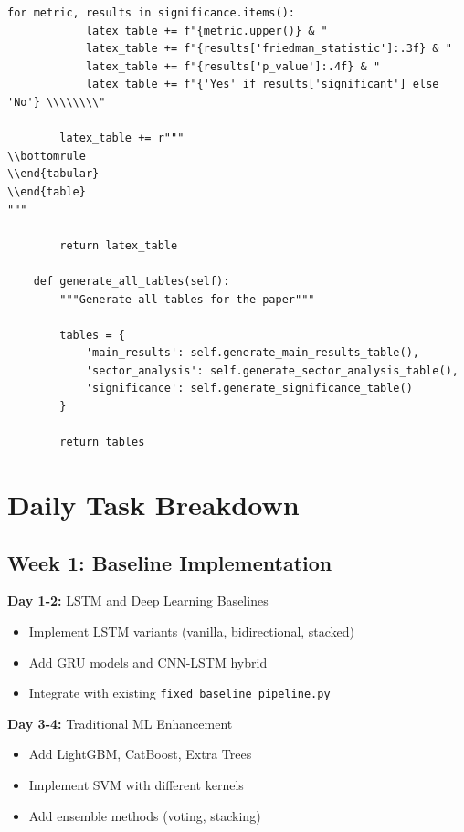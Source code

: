 \documentclass[11pt]{article}
\begin{document}
\begin{lstlisting}[style=pythonstyle, caption=Automated Paper Generation]
        for metric, results in significance.items():
            latex_table += f"{metric.upper()} & "
            latex_table += f"{results['friedman_statistic']:.3f} & "
            latex_table += f"{results['p_value']:.4f} & "
            latex_table += f"{'Yes' if results['significant'] else 'No'} \\\\\\\\"
            
        latex_table += r"""
\\bottomrule
\\end{tabular}
\\end{table}
"""
        
        return latex_table
        
    def generate_all_tables(self):
        """Generate all tables for the paper"""
        
        tables = {
            'main_results': self.generate_main_results_table(),
            'sector_analysis': self.generate_sector_analysis_table(),
            'significance': self.generate_significance_table()
        }
        
        return tables
\end{lstlisting}

\section{Daily Task Breakdown}

\subsection{Week 1: Baseline Implementation}

\textbf{Day 1-2:} LSTM and Deep Learning Baselines
\begin{itemize}
    \item Implement LSTM variants (vanilla, bidirectional, stacked)
    \item Add GRU models and CNN-LSTM hybrid
    \item Integrate with existing \texttt{fixed\_baseline\_pipeline.py}
\end{itemize}

\textbf{Day 3-4:} Traditional ML Enhancement
\begin{itemize}
    \item Add LightGBM, CatBoost, Extra Trees
    \item Implement SVM with different kernels
    \item Add ensemble methods (voting, stacking)
\end{itemize}
\end{document}
